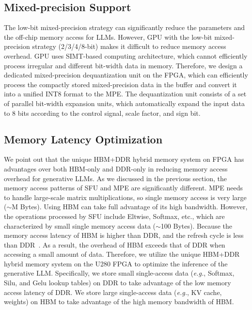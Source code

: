 \subsection{Mixed-precision Support}
The low-bit mixed-precision strategy can significantly reduce the parameters and the off-chip memory access for LLMs. However, GPU with the low-bit mixed-precision strategy (2/3/4/8-bit) makes it difficult to reduce memory access overhead. GPU uses SIMT-based computing architecture, which cannot efficiently process irregular and different bit-width data in memory. 
Therefore, we design a dedicated mixed-precision dequantization unit on the FPGA, which can efficiently process the compactly stored mixed-precision data in the buffer and convert it into a unified INT8 format to the MPE.  The dequantization unit consists of a set of parallel bit-width expansion units, which automatically expand the input data to 8 bits according to the control signal, scale factor, and sign bit.

\vspace{-5pt}
\subsection{Memory Latency Optimization}
We point out that the unique HBM+DDR hybrid memory system on FPGA has advantages over both HBM-only and DDR-only in reducing memory access overhead for generative LLMs. As we discussed in the previous section, the memory access patterns of SFU and MPE are significantly different. MPE needs to handle large-scale matrix multiplications, so single memory access is very large ($\sim$M Bytes). Using HBM can take full advantage of its high bandwidth. However, the operations processed by SFU include Eltwise, Softmax, etc., which are characterized by small single memory access data ($\sim$100 Bytes).
Because the memory access latency of HBM is higher than DDR, and the refresh cycle is less than DDR~\cite{zhao2018bandwidth,wang2020shuhai}. As a result, the overhead of HBM exceeds that of DDR when accessing a small amount of data. Therefore, we utilize the unique HBM+DDR hybrid memory system on the U280 FPGA to optimize the inference of the generative LLM. Specifically, we store small single-access data (\textit{e.g.}, Softmax, Silu, and Gelu lookup tables) on DDR to take advantage of the low memory access latency of DDR. We store large single-access data (\textit{e.g.}, KV cache, weights) on HBM to take advantage of the high memory bandwidth of HBM.
